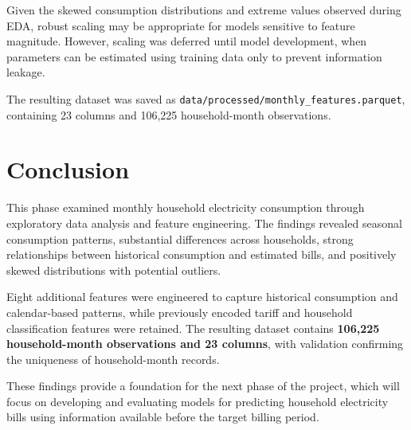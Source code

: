 \documentclass[11pt,a4paper]{article}
\begin{document}
Given the skewed consumption distributions and extreme values observed during EDA, robust scaling may be appropriate for models sensitive to feature magnitude. However, scaling was deferred until model development, when parameters can be estimated using training data only to prevent information leakage.

The resulting dataset was saved as \texttt{data/processed/monthly\_features.parquet}, containing 23 columns and 106,225 household-month observations.
\section{Conclusion}
This phase examined monthly household electricity consumption through exploratory data analysis and feature engineering. The findings revealed seasonal consumption patterns, substantial differences across households, strong relationships between historical consumption and estimated bills, and positively skewed distributions with potential outliers.

Eight additional features were engineered to capture historical consumption and calendar-based patterns, while previously encoded tariff and household classification features were retained. The resulting dataset contains \textbf{106,225 household-month observations and 23 columns}, with validation confirming the uniqueness of household-month records.

These findings provide a foundation for the next phase of the project, which will focus on developing and evaluating models for predicting household electricity bills using information available before the target billing period.
\end{document}
